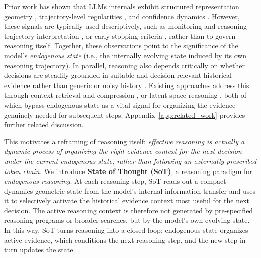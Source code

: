 Prior work has shown that LLMs internals exhibit structured representation geometry \citep{zou2023repe}, trajectory-level regularities \citep{sun2026llm}, and confidence dynamics \citep{tikhonov2026confidence}. 
However, these signals are typically used descriptively, such as monitoring and reasoning-trajectory interpretation \citep{ballon2026probing,damirchi2026truth,feng2025monitoring}, or early stopping criteria \citep{hosseini2026early}, rather than to govern reasoning itself.
Together, these observations point to the significance of the model's \emph{endogenous state} (i.e., the internally evolving state induced by its own reasoning trajectory).
In parallel, reasoning also depends critically on whether decisions are steadily grounded in suitable and decision-relevant historical evidence rather than generic or noisy history \citep{creswell2022selection,press2023measuring,wang2024rat}. Existing approaches address this through context retrieval and compression \citep{jiang2024longllmlingua,li2023compressing,packer2023memgpt}, or latent-space reasoning \citep{hao2025training,wang2025system}, both of which bypass endogenous state as a vital signal for organizing the evidence genuinely needed for subsequent steps.
Appendix~\ref{app:related_work} provides further related discussion.

This motivates a reframing of reasoning itself: \emph{effective reasoning is actually a dynamic process of organizing the right evidence context for the next decision under the current endogenous state, rather than following an externally prescribed token chain.} 
We introduce \textbf{State of Thought (SoT)}, a reasoning paradigm for \emph{endogenous reasoning}. 
At each reasoning step, SoT reads out a compact dynamics-geometric state from the model's internal information transfer and uses it to selectively activate the historical evidence context most useful for the next decision.
The active reasoning context is therefore not generated by pre-specified reasoning programs or broader searches, but by the model's own evolving state. 
In this way, SoT turns reasoning into a closed loop: endogenous state organizes active evidence, which conditions the next reasoning step, and the new step in turn updates the state.

